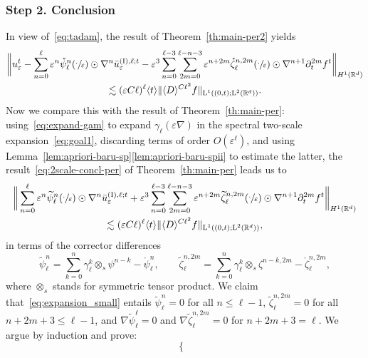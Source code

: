 \documentclass[10pt]{amsart}
\theoremstyle{plain}
\theoremstyle{definition}
\numberwithin{equation}{section}
\newcommand{\e}{\varepsilon}
\newcommand{\R}{\mathbb R}
\newcommand{\Ld}{\operatorname{L}}
\newcommand{\step}[1]{\subsubsection*{Step \textup #1}}
\begin{document}
\step{2. Conclusion}
In view of~\eqref{eq:tadam}, the result of Theorem~\ref{th:main-per2} yields
\begin{multline*}
\bigg\|u_\e^t
-\sum_{n=0}^\ell\e^{n}\mathring\psi_\ell^{n}(\sfrac{\cdot}{\e})\odot\nabla^{n}\bar{u}^{\text{(I)},\ell;t}_{\e}
-\e^3\sum_{n=0}^{\ell-3}\sum_{2m=0}^{\ell-n-3}\e^{n+2m}\mathring\zeta_\ell^{n,2m}(\sfrac\cdot\e)\odot\nabla^{n+1}\partial_t^{2m}f^t\bigg\|_{H^1(\R^d)}\\
\lesssim
(\e C\ell)^{\ell} \langle t\rangle \|\langle D\rangle^{C\ell^2} f\|_{\Ld^1((0,t);\Ld^2(\R^d))}.
\end{multline*}
{{Now we compare this with the result of Theorem~\ref{th:main-per}:
using~\eqref{eq:expand-gam} to expand $\gamma_{\ell}(\e\nabla)$ in the spectral two-scale expansion~\eqref{eq:goal1}, discarding terms of order $O(\e^{\ell})$, and using Lemma~\ref{lem:apriori-baru-sp}\eqref{lem:apriori-baru-spii} to estimate the latter, the result~\eqref{eq:2scale-concl-per} of Theorem~\ref{th:main-per} leads us to}\vspace*{-5pt}
\begin{multline}\label{eq:expansion_small}
\bigg\|
\sum_{n=0}^\ell\e^{n}\widetilde{\psi}_{\ell}^n(\sfrac{\cdot}{\e})\odot\nabla^{n}\bar{u}^{\text{(I)},\ell;t}_{\e}
+\e^3\sum_{n=0}^{\ell-3}\sum_{2m=0}^{\ell-n-3}\e^{n+2m}\widetilde{\zeta}_{\ell}^{n,2m}(\sfrac{\cdot}{\e})\odot\nabla^{n+1}\partial_t^{2m}f^t\bigg\|_{H^1(\R^d)}\\
\lesssim
(\e C\ell)^{\ell} \langle t\rangle \|\langle D\rangle^{C\ell^2} f\|_{\Ld^1((0,t);\Ld^2(\R^d))},
\end{multline}
in terms of the corrector differences\vspace*{-3pt}
\begin{equation*}
\widetilde{\psi}_{\ell}^n=\sum_{k=0}^n\gamma_{\ell}^k\otimes_s\psi^{n-k}-\mathring\psi_\ell^{n},\qquad \widetilde{\zeta}_{\ell}^{n,2m}=\sum_{k=0}^n\gamma_{\ell}^k\otimes_s\zeta^{n-k,2m}-\mathring\zeta_\ell^{n,2m},
\end{equation*}
{where $\otimes_s$ stands for symmetric tensor product.
We claim that~\eqref{eq:expansion_small} entails $\widetilde{\psi}_{\ell}^n=0$ for all $n\leq \ell-1$, $\widetilde{\zeta}_{\ell}^{n,2m}=0$ for all $n+2m+3\leq\ell-1$, and $\nabla\widetilde{\psi}_{\ell}^{\ell}=0$ and $\nabla \widetilde{\zeta}_{\ell}^{n,2m}=0$ for $n+2m+3=\ell$.
We argue by induction and prove:\vspace*{-3pt}
\begin{equation}\label{eq:iterate-vanishcorrdiff}
\left\{\begin{array}{lll}

\end{array}
\end{equation}}}
\end{document}

